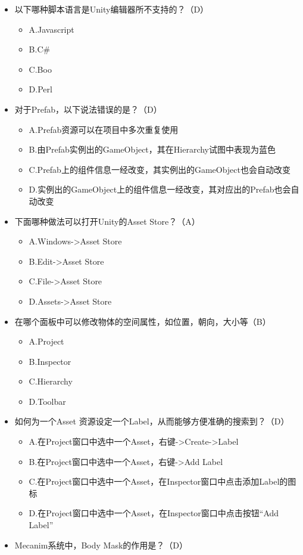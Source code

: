 \documentclass[9pt, b5paper]{article}
\begin{document}
\begin{itemize}
\item 以下哪种脚本语言是Unity编辑器所不支持的？（D）
\begin{itemize}
\item A.Javascript
\item B.C\#
\item C.Boo
\item D.Perl
\end{itemize}
\item 对于Prefab，以下说法错误的是？（D）
\begin{itemize}
\item A.Prefab资源可以在项目中多次重复使用
\item B.由Prefab实例出的GameObject，其在Hierarchy试图中表现为蓝色
\item C.Prefab上的组件信息一经改变，其实例出的GameObject也会自动改变
\item D.实例出的GameObject上的组件信息一经改变，其对应出的Prefab也会自动改变
\end{itemize}
\item 下面哪种做法可以打开Unity的Asset Store？（A）
\begin{itemize}
\item A.Windows->Asset Store
\item B.Edit->Asset Store
\item C.File->Asset Store
\item D.Assets->Asset Store
\end{itemize}
\item 在哪个面板中可以修改物体的空间属性，如位置，朝向，大小等（B）
\begin{itemize}
\item A.Project
\item B.Inspector
\item C.Hierarchy
\item D.Toolbar
\end{itemize}
\item 如何为一个Asset 资源设定一个Label，从而能够方便准确的搜索到？（D）
\begin{itemize}
\item A.在Project窗口中选中一个Asset，右键->Create->Label
\item B.在Project窗口中选中一个Asset，右键->Add Label
\item C.在Project窗口中选中一个Asset，在Inspector窗口中点击添加Label的图标
\item D.在Project窗口中选中一个Asset，在Inspector窗口中点击按钮“Add Label”
\end{itemize}
\item Mecanim系统中，Body Mask的作用是？（D）

\end{itemize}
\end{document}
